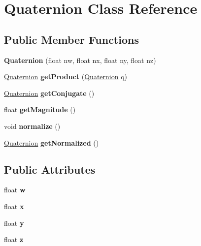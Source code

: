 \hypertarget{classQuaternion}{}\section{Quaternion Class Reference}
\label{classQuaternion}
\subsection*{Public Member Functions}
\begin{DoxyCompactItemize}
\item 
\mbox{\label{classQuaternion_ad8158a59767dc3d42ebf0324b82ba95a}} 
{\bfseries Quaternion} (float nw, float nx, float ny, float nz)
\item 
\mbox{\label{classQuaternion_a3ff8405ed92a3ca16de656e6c83b4028}} 
\mbox{\hyperlink{classQuaternion}{Quaternion}} {\bfseries get\+Product} (\mbox{\hyperlink{classQuaternion}{Quaternion}} q)
\item 
\mbox{\label{classQuaternion_a079a5673188a8a7d608e8495de0dd119}} 
\mbox{\hyperlink{classQuaternion}{Quaternion}} {\bfseries get\+Conjugate} ()
\item 
\mbox{\label{classQuaternion_a6d0f82bd29fcbe29f784e848ec2eb8f1}} 
float {\bfseries get\+Magnitude} ()
\item 
\mbox{\label{classQuaternion_a48e6bafb249c895ed25f29dc9170e11e}} 
void {\bfseries normalize} ()
\item 
\mbox{\label{classQuaternion_a61f5f7cb9b248aa259292c3c1960a1f0}} 
\mbox{\hyperlink{classQuaternion}{Quaternion}} {\bfseries get\+Normalized} ()
\end{DoxyCompactItemize}
\subsection*{Public Attributes}
\begin{DoxyCompactItemize}
\item 
\mbox{\label{classQuaternion_aa44a65ab99e36f6ab8771030eed8a7ad}} 
float {\bfseries w}
\item 
\mbox{\label{classQuaternion_a8b80f191a3155cc0158d2b4f4d50b2cb}} 
float {\bfseries x}
\item 
\mbox{\label{classQuaternion_a3bd3f270462944423611f44e19d2511b}} 
float {\bfseries y}
\item 
\mbox{\label{classQuaternion_a625cb732d8ff3083e7852b86b736ab29}} 
float {\bfseries z}
\end{DoxyCompactItemize}


